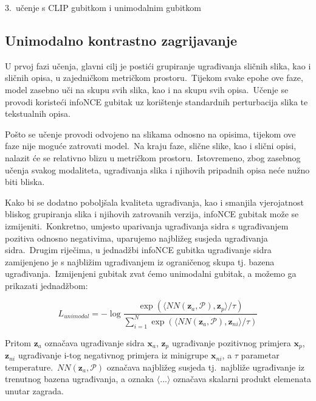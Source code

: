 \documentclass[times, utf8, seminar, numeric]{fer}
\begin{document}
3.\ učenje s CLIP gubitkom i unimodalnim gubitkom  

\pagebreak

\subsection{Unimodalno kontrastno zagrijavanje}

U prvoj fazi učenja, glavni cilj je postići grupiranje ugrađivanja sličnih slika, kao i sličnih opisa, u zajedničkom metričkom prostoru.\ 
Tijekom svake epohe ove faze, model zasebno uči na skupu svih slika, kao i na skupu svih opisa.\ 
Učenje se provodi koristeći infoNCE gubitak uz korištenje standardnih perturbacija slika te tekstualnih opisa.\  
  
Pošto se učenje provodi odvojeno na slikama odnosno na opisima, tijekom ove faze nije moguće zatrovati model.\ 
Na kraju faze, slične slike, kao i slični opisi, nalazit će se relativno blizu u metričkom prostoru.\ Istovremeno, zbog zasebnog učenja svakog modaliteta, ugrađivanja slika i njihovih pripadnih opisa neće nužno biti bliska.\ 
  
Kako bi se dodatno poboljšala kvaliteta ugrađivanja, kao i smanjila vjerojatnost bliskog grupiranja slika i njihovih zatrovanih verzija, infoNCE gubitak može se izmijeniti.\ 
Konkretno, umjesto uparivanja ugrađivanja sidra s ugrađivanjem pozitiva odnosno negativima, uparujemo najbližeg susjeda ugrađivanja sidra.\ 
Drugim riječima, u jednadžbi infoNCE gubitka ugrađivanje sidra zamijenjeno je s najbližim ugrađivanjem iz ograničenog skupa tj. bazena ugrađivanja.\ 
Izmijenjeni gubitak zvat ćemo unimodalni gubitak, a možemo ga prikazati jednadžbom:

\begin{equation}
    L_{unimodal} = - \log{\frac{\exp(\langle NN(\bm{z}_{a}, \mathcal{P}), \bm{z}_{p} \rangle / \tau)}{\sum_{i=1}^{N}{\exp(\langle NN(\bm{z}_{a}, \mathcal{P}), \bm{z}_{ni} \rangle / \tau)}}}
    \label{eq:unimodal_loss}
\end{equation}

Pritom $\bm{z}_{a}$ označava ugrađivanje sidra $\bm{x}_{a}$, $\bm{z}_{p}$ ugrađivanje pozitivnog primjera $\bm{x}_{p}$, $\bm{z}_{ni}$ ugrađivanje i-tog negativnog primjera iz minigrupe $\bm{x}_{ni}$, a $\tau$ parametar temperature.\ 
$NN(\bm{z}_{a}, \mathcal{P})$ označava najbližeg susjeda tj.\ najbliže ugrađivanje iz trenutnog bazena ugrađivanja, a oznaka $\langle ... \rangle$ označava skalarni produkt elemenata unutar zagrada.\
\end{document}
